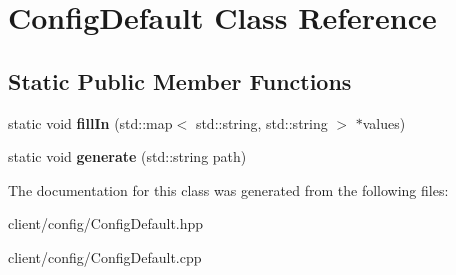 \hypertarget{class_config_default}{\section{Config\-Default Class Reference}
\label{class_config_default}
}
\subsection*{Static Public Member Functions}
\begin{DoxyCompactItemize}
\item 
\hypertarget{class_config_default_a2ca3b26d929d8983e9783bc43cf8441c}{static void {\bfseries fill\-In} (std\-::map$<$ std\-::string, std\-::string $>$ $\ast$values)}\label{class_config_default_a2ca3b26d929d8983e9783bc43cf8441c}

\item 
\hypertarget{class_config_default_a57727b2fbe9972c9f0caae8d1dc975f1}{static void {\bfseries generate} (std\-::string path)}\label{class_config_default_a57727b2fbe9972c9f0caae8d1dc975f1}

\end{DoxyCompactItemize}


The documentation for this class was generated from the following files\-:\begin{DoxyCompactItemize}
\item 
client/config/Config\-Default.\-hpp\item 
client/config/Config\-Default.\-cpp\end{DoxyCompactItemize}
